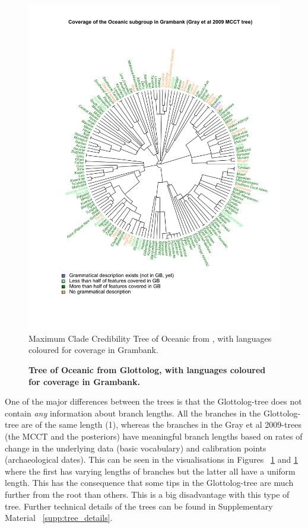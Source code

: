 \documentclass[a4paper,10pt]{article} %
\begin{document}
\begin{figure}[H]
\centering
\includegraphics[width=\textwidth]{illustrations/plots_from_R/coverage_plots/tree/Oceanic_tree_desc_status_gray_et_al_tree_mcct.png}
\caption{{Maximum Clade Credibility Tree of Oceanic from \citet{grayetal_2009}, with languages coloured for coverage in Grambank.}}
\label{tree_coverage_oceanic_gray}
\end{figure}

\begin{figure}[H]
\centering
\caption{\textbf{Tree of Oceanic from Glottolog, with languages coloured for coverage in Grambank.}}
\label{tree_coverage_oceanic_glottolog}
\end{figure}

One of the major differences between the trees is that the Glottolog-tree does not contain \emph{any} information about branch lengths. All the branches in the Glottolog-tree are of the same length (1), whereas the branches in the Gray et al 2009-trees (the MCCT and the posteriors) have meaningful branch lengths based on rates of change in the underlying data (basic vocabulary) and calibration points (archaeological dates). This can be seen in the visualisations in Figures ~\ref{tree_coverage_oceanic_gray} and \ref{tree_coverage_oceanic_gray} where the first has varying lengths of branches but the latter all have a uniform length. This has the consequence that some tips in the Glottolog-tree are much further from the root than others. This is a big disadvantage with this type of tree. Further technical details of the trees can be found in Supplementary Material ~\ref{supp:tree_details}.
\end{document}

